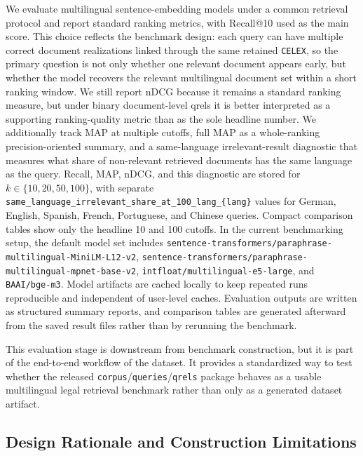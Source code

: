 We evaluate multilingual sentence-embedding models under a common retrieval protocol and report standard ranking metrics, with Recall@10 used as the main score. This choice reflects the benchmark design: each query can have multiple correct document realizations linked through the same retained \texttt{CELEX}, so the primary question is not only whether one relevant document appears early, but whether the model recovers the relevant multilingual document set within a short ranking window. We still report nDCG because it remains a standard ranking measure, but under binary document-level qrels it is better interpreted as a supporting ranking-quality metric than as the sole headline number. We additionally track MAP at multiple cutoffs, full MAP as a whole-ranking precision-oriented summary, and a same-language irrelevant-result diagnostic that measures what share of non-relevant retrieved documents has the same language as the query. Recall, MAP, nDCG, and this diagnostic are stored for \(k \in \{10,20,50,100\}\), with separate \texttt{same\_language\_irrelevant\_share\_at\_100\_lang\_\{lang\}} values for German, English, Spanish, French, Portuguese, and Chinese queries. Compact comparison tables show only the headline 10 and 100 cutoffs. In the current benchmarking setup, the default model set includes \texttt{sentence-transformers/paraphrase-multilingual-MiniLM-L12-v2}, \texttt{sentence-transformers/paraphrase-multilingual-mpnet-base-v2}, \texttt{intfloat/multilingual-e5-large}, and \texttt{BAAI/bge-m3}. Model artifacts are cached locally to keep repeated runs reproducible and independent of user-level caches. Evaluation outputs are written as structured summary reports, and comparison tables are generated afterward from the saved result files rather than by rerunning the benchmark.

This evaluation stage is downstream from benchmark construction, but it is part of the end-to-end workflow of the dataset. It provides a standardized way to test whether the released \texttt{corpus}/\texttt{queries}/\texttt{qrels} package behaves as a usable multilingual legal retrieval benchmark rather than only as a generated dataset artifact.

\subsection{Design Rationale and Construction Limitations}

